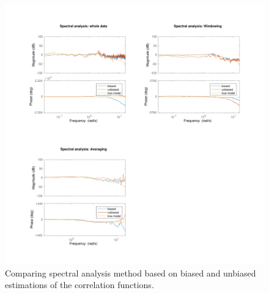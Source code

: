 \documentclass[a4paper,11pt]{article}
\begin{document}
\begin{figure}[H]
	\centering
    \hspace*{-2.5cm}
    \includegraphics[height=1.3\textwidth]{images/ce2_2_unbiased}
    \caption{Comparing spectral analysis method based on biased and unbiased estimations of the correlation functions.}
    \label{fig:bode_unbiased}
\end{figure}
\end{document}

